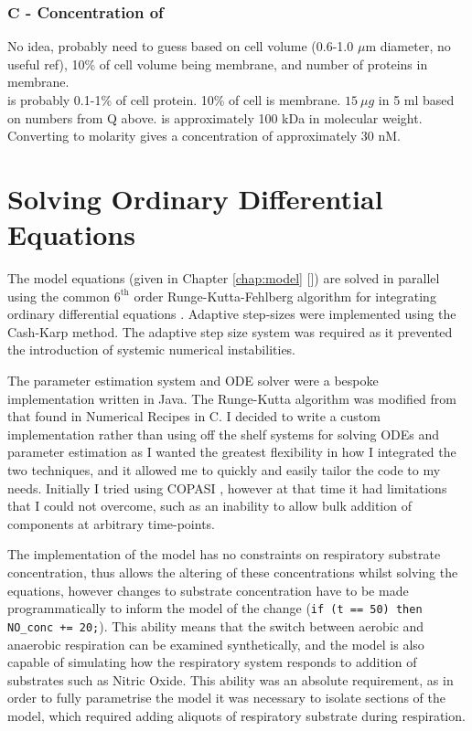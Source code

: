 \subsubsection*{$\mathbf{C}$ {\bf- Concentration of \cbbthree{}}}
No idea, probably need to guess based on cell volume (0.6-1.0 $\mu$m diameter, no useful ref), 10\% of cell volume being membrane, and number of proteins in membrane.\\
\cbbthree{} is probably 0.1-1\% of cell protein. 10\% of cell is membrane.
$15~\mu g$ in 5 ml based on numbers from Q above. \cbbthree{} is approximately 100 kDa in molecular weight. Converting to molarity gives a concentration of approximately 30 nM.

\section{Solving Ordinary Differential Equations}
The model equations (given in Chapter \ref{chap:model} []) are solved in parallel using the common $\mathrm{6}^\mathrm{th}$ order Runge-Kutta-Fehlberg algorithm for integrating ordinary differential equations \cite{Butcher2003}. Adaptive step-sizes were implemented using the Cash-Karp method\cite{Cash1990}. The adaptive step size system was required as it prevented the introduction of systemic numerical instabilities.

The parameter estimation system and ODE solver were a bespoke implementation written in Java. The Runge-Kutta algorithm was modified from that found in Numerical Recipes in C\cite{Press1992}. I decided to write a custom implementation rather than using off the shelf systems for solving ODEs and parameter estimation as I wanted the greatest flexibility in how I integrated the two techniques, and it allowed me to quickly and easily tailor the code to my needs. Initially I tried using COPASI \cite{Hoops2006}, however at that time it had limitations that I could not overcome, such as an inability to allow bulk addition of components at arbitrary time-points.

The implementation of the model has no constraints on respiratory substrate concentration, thus allows the altering of these concentrations whilst solving the equations, however changes to substrate concentration have to be made programmatically to inform the model of the change (\texttt{if (t == 50) then NO\_conc += 20;}). This ability means that the switch between aerobic and anaerobic respiration can be examined synthetically, and the model is also capable of simulating how the respiratory system responds to addition of substrates such as Nitric Oxide. This ability was an absolute requirement, as in order to fully parametrise the model it was necessary to isolate sections of the model, which required adding aliquots of respiratory substrate during respiration.


